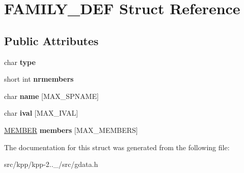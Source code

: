 \hypertarget{structFAMILY__DEF}{}\section{F\+A\+M\+I\+L\+Y\+\_\+\+D\+EF Struct Reference}
\label{structFAMILY__DEF}
\subsection*{Public Attributes}
\begin{DoxyCompactItemize}
\item 
\mbox{\label{structFAMILY__DEF_a6bd4032c329bb2378a2d8614d55dda25}} 
char {\bfseries type}
\item 
\mbox{\label{structFAMILY__DEF_a3c61435bf88ba89ac8ff175bb5984811}} 
short int {\bfseries nrmembers}
\item 
\mbox{\label{structFAMILY__DEF_aad0c9bef6fde1f240bb948f13b94e429}} 
char {\bfseries name} \mbox{[}M\+A\+X\+\_\+\+S\+P\+N\+A\+ME\mbox{]}
\item 
\mbox{\label{structFAMILY__DEF_a1b596ff5d4762f204d50f31ae5c7e087}} 
char {\bfseries ival} \mbox{[}M\+A\+X\+\_\+\+I\+V\+AL\mbox{]}
\item 
\mbox{\label{structFAMILY__DEF_aaaeb2012ae22d73702ab5b5dccf433ce}} 
\mbox{\hyperlink{structMEMBER}{M\+E\+M\+B\+ER}} {\bfseries members} \mbox{[}M\+A\+X\+\_\+\+M\+E\+M\+B\+E\+RS\mbox{]}
\end{DoxyCompactItemize}


The documentation for this struct was generated from the following file\+:\begin{DoxyCompactItemize}
\item 
src/kpp/kpp-\/2..\+\_/src/gdata.\+h\end{DoxyCompactItemize}
